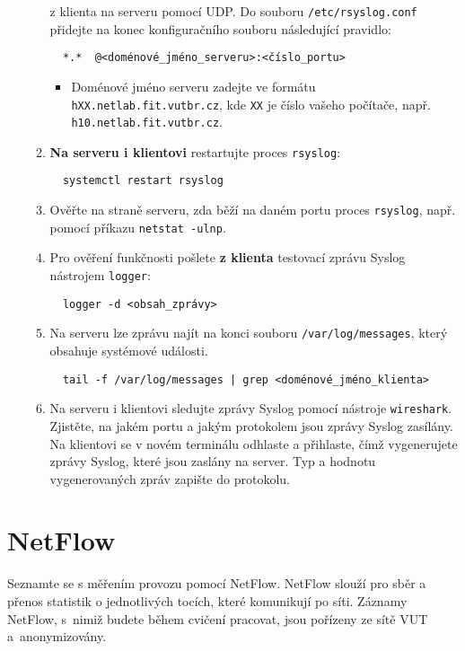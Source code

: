 \begin{itemize}
\begin{enumerate}
        z klienta na serveru pomocí UDP.
        Do souboru {\tt /etc/rsyslog.conf} přidejte na konec konfiguračního souboru následující pravidlo:
\begin{verbatim} 
  *.*  @<doménové_jméno_serveru>:<číslo_portu>
\end{verbatim}
      \begin{itemize}
        \item Doménové jméno serveru zadejte ve formátu \texttt{hXX.netlab.fit.vutbr.cz}, kde \texttt{XX} je číslo vašeho počítače, např. \texttt{h10.netlab.fit.vutbr.cz}.
      \end{itemize}
      \item {\bf Na serveru i klientovi} restartujte proces {\tt rsyslog}: 
\begin{verbatim}
  systemctl restart rsyslog
\end{verbatim} 
      \item Ověřte na straně serveru, zda běží na daném portu proces {\tt rsyslog}, např. pomocí příkazu \verb|netstat -ulnp|.
      \item Pro ověření funkčnosti pošlete {\bf z klienta} testovací zprávu Syslog nástrojem {\tt logger}:
\begin{verbatim} 
  logger -d <obsah_zprávy>
\end{verbatim} 
      \item Na serveru lze zprávu najít na konci souboru {\tt /var/log/messages}, který obsahuje systémové události.
\begin{verbatim} 
  tail -f /var/log/messages | grep <doménové_jméno_klienta>
\end{verbatim} 
      \item Na serveru i klientovi sledujte zprávy Syslog pomocí nástroje {\tt wireshark}. Zjistěte, na jakém portu a jakým protokolem jsou zprávy Syslog zasílány. Na klientovi se v novém terminálu odhlaste a přihlaste, čímž vygenerujete zprávy Syslog, které jsou zaslány na server. Typ a hodnotu vygenerovaných zpráv zapište do protokolu.
    \end{enumerate}
\end{itemize}

\section{NetFlow}
Seznamte se s měřením provozu pomocí NetFlow. NetFlow slouží pro sběr a přenos statistik o jednotlivých tocích, které komunikují po síti. Záznamy NetFlow, s~nimiž budete během cvičení pracovat, jsou pořízeny ze sítě VUT a~anonymizovány.
